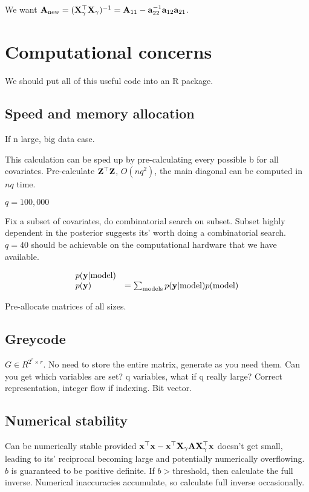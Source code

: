\documentclass{amsart}
\begin{document}
We want ${\bf A}_{\text{new}} = ({\bf X}_\gamma^\top {\bf X}_\gamma)^{-1} = {\bf A}_{11} - {\bf a}_{22}^{-1} {\bf a}_{12} {\bf a}_{21}$.

\section{Computational concerns}
We should put all of this useful code into an R package.

\subsection{Speed and memory allocation}
If n large, big data case.

This calculation can be sped up by pre-calculating every possible b for all covariates.
Pre-calculate ${\bf Z}^\top {\bf Z}$, $O(nq^2)$, the main diagonal can be computed in $nq$ time.

$q = 100,000$

Fix a subset of covariates, do combinatorial search on subset.
Subset highly dependent in the posterior suggests its' worth doing a combinatorial search.
$q = 40$ should be achievable on the computational hardware that we have available.

\begin{equation*}
\begin{array}{ll}
p({\bf y} | \text{model}) & \\
p({\bf y}) &= \sum_{\text{models}} p({\bf y} | \text{model}) p(\text{model})
\end{array}
\end{equation*}

Pre-allocate matrices of all sizes.

\subsection{Greycode}

$G \in R^{2^r \times r}$. No need to store the entire matrix, generate as you need them. Can you get which
variables are set? q variables, what if q really large? Correct representation, integer flow if indexing. Bit
vector.

\subsection{Numerical stability}

Can be numerically stable provided ${\bf x}^\top {\bf x} - {\bf x}^\top {\bf X}_\gamma {\bf A} {\bf X}_\gamma^\top {\bf x}$ doesn't get
small, leading to its' reciprocal becoming large and potentially numerically overflowing. $b$ is guaranteed to
be positive definite. If $b > \text{threshold}$, then calculate the full inverse. Numerical inaccuracies
accumulate, so calculate full inverse occasionally.
\end{document}
